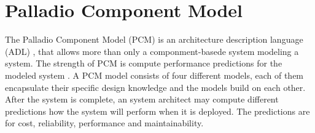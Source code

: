 \section{Palladio Component Model}
\label{sec:PCMIntro}
The Palladio Component Model (PCM) is an architecture description language (ADL) , that allows more than only a componment-basede system modeling a system. The strength of PCM is compute performance predictions for the modeled system \cite{PCM}. 
A PCM model consists of four different models, each of them encapsulate their specific design knowledge and the models build on each other. After the system is complete, an system architect may compute different predictions how the system will perform when it is deployed. The predictions are for cost, reliability, performance and maintainability.

